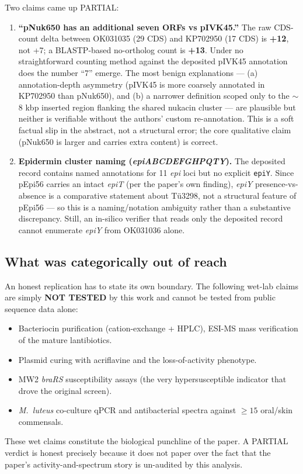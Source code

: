 \documentclass[11pt,letterpaper]{article}
\begin{document}
Two claims came up PARTIAL:
\begin{enumerate}
  \item \textbf{``pNuk650 has an additional seven ORFs vs pIVK45.''} The raw CDS-count delta between OK031035 (29 CDS) and KP702950 (17 CDS) is \textbf{+12}, not +7; a BLASTP-based no-ortholog count is \textbf{+13}. Under no straightforward counting method against the deposited pIVK45 annotation does the number ``7'' emerge. The most benign explanations --- (a) annotation-depth asymmetry (pIVK45 is more coarsely annotated in KP702950 than pNuk650), and (b) a narrower definition scoped only to the $\sim$8 kbp inserted region flanking the shared nukacin cluster --- are plausible but neither is verifiable without the authors' custom re-annotation. This is a soft factual slip in the abstract, not a structural error; the core qualitative claim (pNuk650 is larger and carries extra content) is correct.
  \item \textbf{Epidermin cluster naming (\textit{epiABCDEFGHPQTY}).} The deposited record contains named annotations for 11 \textit{epi} loci but no explicit \texttt{epiY}. Since pEpi56 carries an intact \textit{epiT} (per the paper's own finding), \textit{epiY} presence-vs-absence is a comparative statement about T\"u3298, not a structural feature of pEpi56 --- so this is a naming/notation ambiguity rather than a substantive discrepancy. Still, an in-silico verifier that reads only the deposited record cannot enumerate \textit{epiY} from OK031036 alone.
\end{enumerate}

\subsection{What was categorically out of reach}

An honest replication has to state its own boundary. The following wet-lab claims are simply \textbf{NOT TESTED} by this work and cannot be tested from public sequence data alone:
\begin{itemize}
  \item Bacteriocin purification (cation-exchange + HPLC), ESI-MS mass verification of the mature lantibiotics.
  \item Plasmid curing with acriflavine and the loss-of-activity phenotype.
  \item MW2 \textit{braRS} susceptibility assays (the very hypersusceptible indicator that drove the original screen).
  \item \textit{M.\ luteus} co-culture qPCR and antibacterial spectra against $\geq 15$ oral/skin commensals.
\end{itemize}
These wet claims constitute the biological punchline of the paper. A PARTIAL verdict is honest precisely because it does not paper over the fact that the paper's activity-and-spectrum story is un-audited by this analysis.
\end{document}
